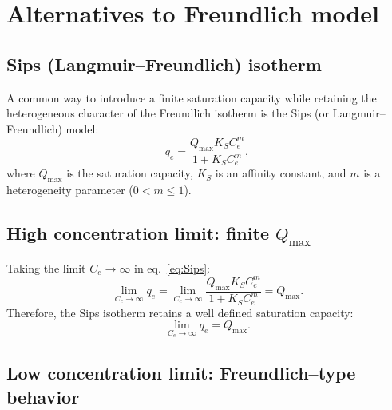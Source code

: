 \documentclass[12pt]{article}
\begin{document}
	\noindent{}
		
	\section{Alternatives to Freundlich model}
	
	\subsection{Sips (Langmuir--Freundlich) isotherm }
	
	A common way to introduce a finite saturation capacity while retaining
	the heterogeneous character of the Freundlich isotherm is the
	Sips (or Langmuir--Freundlich) model:
	\begin{equation}
		q_e = \frac{Q_{\max} K_S C_e^{m}}{1 + K_S C_e^{m}},
		\label{eq:Sips}
	\end{equation}
	where \(Q_{\max}\) is the saturation capacity, \(K_S\) is an affinity
	constant, and \(m\) is a heterogeneity parameter
	(\(0 < m \leq 1\)).
	
	\subsection{High concentration limit: finite \(Q_{\max}\)}
	
	Taking the limit \(C_e \to \infty\) in eq.~\eqref{eq:Sips}:
	\begin{equation}
		\lim_{C_e \to \infty} q_e
		= \lim_{C_e \to \infty}
		\frac{Q_{\max} K_S C_e^{m}}{1 + K_S C_e^{m}}
		= Q_{\max}.
	\end{equation}
	Therefore, the Sips isotherm retains a well defined saturation capacity:
	\begin{equation}
		\boxed{
			\displaystyle \lim_{C_e \to \infty} q_e = Q_{\max}.
		}
	\end{equation}
	
	\subsection{Low concentration limit: Freundlich--type behavior}
	
\end{document}

